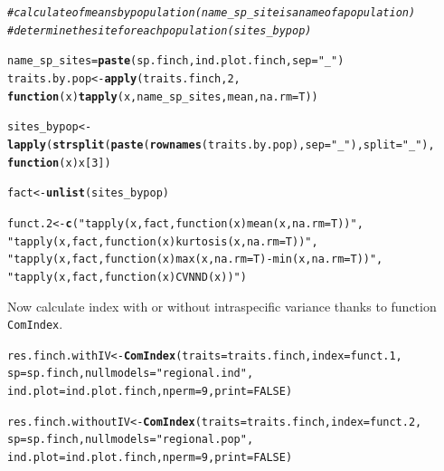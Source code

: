 \documentclass[12pt]{article}\usepackage[]{graphicx}\usepackage[]{color}
\makeatletter
\newcommand{\hlnum}[1]{\textcolor[rgb]{0.686,0.059,0.569}{#1}}%
\newcommand{\hlstr}[1]{\textcolor[rgb]{0.192,0.494,0.8}{#1}}%
\newcommand{\hlcom}[1]{\textcolor[rgb]{0.678,0.584,0.686}{\textit{#1}}}%
\newcommand{\hlstd}[1]{\textcolor[rgb]{0.345,0.345,0.345}{#1}}%
\newcommand{\hlkwa}[1]{\textcolor[rgb]{0.161,0.373,0.58}{\textbf{#1}}}%
\newcommand{\hlkwb}[1]{\textcolor[rgb]{0.69,0.353,0.396}{#1}}%
\newcommand{\hlkwc}[1]{\textcolor[rgb]{0.333,0.667,0.333}{#1}}%
\newcommand{\hlkwd}[1]{\textcolor[rgb]{0.737,0.353,0.396}{\textbf{#1}}}%
\newenvironment{kframe}{%
 \def\at@end@of@kframe{}%
 \ifinner\ifhmode%
  \def\at@end@of@kframe{\end{minipage}}%
  \begin{minipage}{\columnwidth}%
 \fi\fi%
 \def\FrameCommand##1{\hskip\@totalleftmargin \hskip-\fboxsep
 \colorbox{shadecolor}{##1}\hskip-\fboxsep
     \hskip-\linewidth \hskip-\@totalleftmargin \hskip\columnwidth}%
 \MakeFramed {\advance\hsize-\width
   \@totalleftmargin\z@ \linewidth\hsize
   \@setminipage}}%
 {\par\unskip\endMakeFramed%
 \at@end@of@kframe}
\newenvironment{knitrout}{}{} %
\makeatother
\begin{document}
\begin{knitrout}
\color{fgcolor}\begin{kframe}
\begin{alltt}
\hlcom{#calculate  of means by population (name_sp_site is a name of a population) }
\hlcom{#determine the site for each population (sites_bypop)}

\hlstd{name_sp_sites} \hlkwb{=} \hlkwd{paste}\hlstd{(sp.finch, ind.plot.finch,} \hlkwc{sep} \hlstd{=} \hlstr{"_"}\hlstd{)}
\hlstd{traits.by.pop}\hlkwb{<-}\hlkwd{apply}\hlstd{(traits.finch,} \hlnum{2} \hlstd{,}
           \hlkwa{function} \hlstd{(}\hlkwc{x}\hlstd{)} \hlkwd{tapply}\hlstd{(x, name_sp_sites, mean ,} \hlkwc{na.rm} \hlstd{= T))}

\hlstd{sites_bypop}\hlkwb{<-}\hlkwd{lapply}\hlstd{(}\hlkwd{strsplit}\hlstd{(}\hlkwd{paste}\hlstd{(}\hlkwd{rownames}\hlstd{(traits.by.pop),} \hlkwc{sep} \hlstd{=} \hlstr{"_"}\hlstd{),} \hlkwc{split} \hlstd{=} \hlstr{"_"}\hlstd{),}
          \hlkwa{function}\hlstd{(}\hlkwc{x}\hlstd{) x[}\hlnum{3}\hlstd{])}

\hlstd{fact}\hlkwb{<-}\hlkwd{unlist}\hlstd{(sites_bypop)}

\hlstd{funct.2}\hlkwb{<-}\hlkwd{c}\hlstd{(}\hlstr{"tapply(x, fact, function(x) mean(x, na.rm = T))"}\hlstd{,}
          \hlstr{"tapply(x, fact, function(x) kurtosis(x, na.rm = T))"}\hlstd{,}
          \hlstr{"tapply(x, fact, function(x) max(x, na.rm = T)-min(x, na.rm = T))"}\hlstd{,}
          \hlstr{"tapply(x, fact, function(x) CVNND(x))"}\hlstd{)}
\end{alltt}
\end{kframe}
\end{knitrout}

Now calculate index with or without intraspecific variance thanks to function \texttt{ComIndex}.
\begin{knitrout}
\color{fgcolor}\begin{kframe}
\begin{alltt}
\hlstd{res.finch.withIV}\hlkwb{<-}\hlkwd{ComIndex}\hlstd{(}\hlkwc{traits} \hlstd{= traits.finch,} \hlkwc{index} \hlstd{= funct.1,}
               \hlkwc{sp} \hlstd{= sp.finch,} \hlkwc{nullmodels} \hlstd{=} \hlstr{"regional.ind"}\hlstd{,}
               \hlkwc{ind.plot} \hlstd{= ind.plot.finch,} \hlkwc{nperm} \hlstd{=} \hlnum{9}\hlstd{,} \hlkwc{print} \hlstd{=} \hlnum{FALSE}\hlstd{)}
\end{alltt}


{\ttfamily\noindent\bfseries\color{errorcolor}{\#\# Error: objet 's' introuvable}}\begin{alltt}
\hlstd{res.finch.withoutIV}\hlkwb{<-}\hlkwd{ComIndex}\hlstd{(}\hlkwc{traits} \hlstd{= traits.finch,} \hlkwc{index} \hlstd{= funct.2,}
               \hlkwc{sp} \hlstd{= sp.finch,} \hlkwc{nullmodels} \hlstd{=} \hlstr{"regional.pop"}\hlstd{,}
               \hlkwc{ind.plot} \hlstd{= ind.plot.finch,} \hlkwc{nperm} \hlstd{=} \hlnum{9}\hlstd{,} \hlkwc{print} \hlstd{=} \hlnum{FALSE}\hlstd{)}
\end{alltt}
\end{kframe}
\end{knitrout}
\end{document}
